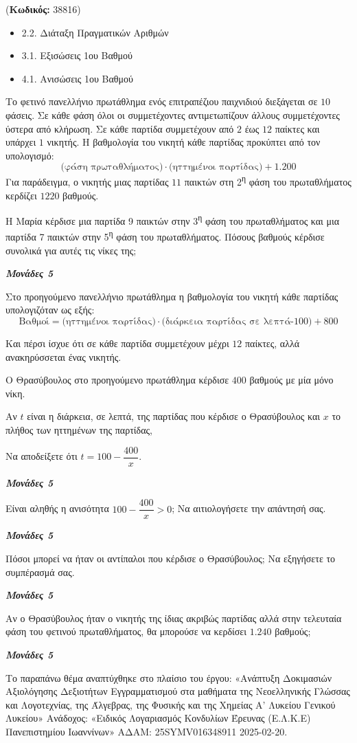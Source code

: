 \documentclass[11pt,a4paper,twoside]{book}
\newcounter{askhsh}[chapter]
\renewcommand{\theaskhsh}{
	\bf{\titlefont{\Large{\thechapter}}.\arabic{askhsh}}
}
\newcommand{\Askhsh}[2]{\refstepcounter{askhsh}{\titlefont{Άσκηση\theaskhsh} - \textcolor{maincolor}{ΘΕΜΑ #2}} ({\small{\textbf{Κωδικός:} #1}})\\}{}
\newenvironment{ylh}{
\begin{tcolorbox}[
breakable,
enhanced standard,
titlerule=0pt,
toprule=0pt, 
rightrule=0pt, 
bottomrule=0pt,
title={\titlefont Ύλη άσκησης},
colback=white,
opacityback=0,
left=2mm,
top=1mm,
bottom=0mm,
boxrule=0pt,
colframe=white,
borderline west={1.5mm}{0pt}{secondarycolor},
leftrule=2mm,
sharp corners,
coltitle=black
]
\begin{itemize}[leftmargin=3mm, itemsep=0mm, label=\textcolor{secondarycolor}{{\small\faBook}}]
}{
\end{itemize}
\end{tcolorbox}
}
\newcommand{\monades}[1]{
\hspace*{\fill}
\textbf{\textit{\textcolor{maincolor}{Μονάδες #1}}}}
\begin{document}
\vspace{4mm}
\Askhsh{38816}{4}
\begin{ylh}
    \item 2.2. Διάταξη Πραγματικών Αριθμών
    \item 3.1. Εξισώσεις 1ου Βαθμού
    \item 4.1. Ανισώσεις 1ου Βαθμού
\end{ylh}

Το φετινό πανελλήνιο πρωτάθλημα ενός επιτραπέζιου παιχνιδιού διεξάγεται σε $10$ φάσεις. Σε κάθε φάση όλοι οι συμμετέχοντες αντιμετωπίζουν άλλους συμμετέχοντες ύστερα από κλήρωση. Σε κάθε παρτίδα συμμετέχουν από $2$ έως $12$ παίκτες και υπάρχει $1$ νικητής. Η βαθμολογία του νικητή κάθε παρτίδας προκύπτει από τον υπολογισμό:
\[\text{(φάση πρωταθλήματος)}\cdot\text{(ηττημένοι παρτίδας)}+1.200\]
Για παράδειγμα, ο νικητής μιας παρτίδας $11$ παικτών στη 2\textsuperscript{η} φάση του πρωταθλήματος κερδίζει $1220$ βαθμούς.
\begin{alist}
\item Η Μαρία κέρδισε μια παρτίδα 9 παικτών στην 3\textsuperscript{η} φάση του πρωταθλήματος και μια παρτίδα 7 παικτών στην 5\textsuperscript{η} φάση του πρωταθλήματος. Πόσους βαθμούς κέρδισε συνολικά για αυτές τις νίκες της;
\monades{5}
\item Στο προηγούμενο πανελλήνιο πρωτάθλημα η βαθμολογία του νικητή κάθε παρτίδας υπολογιζόταν ως εξής:
\[\text{Βαθμοί}=\text{(ηττημένοι παρτίδας)}\cdot\text{(διάρκεια παρτίδας σε λεπτά-100)}+800\]

Και πέρσι ίσχυε ότι σε κάθε παρτίδα συμμετέχουν μέχρι $12$ παίκτες, αλλά ανακηρύσσεται ένας νικητής.

Ο Θρασύβουλος στο προηγούμενο πρωτάθλημα κέρδισε $400$ βαθμούς με μία μόνο νίκη.

Αν $t$ είναι η διάρκεια, σε λεπτά, της παρτίδας που κέρδισε ο Θρασύβουλος και $x$ το πλήθος των ηττημένων της παρτίδας,

\begin{rlist}
\item Να αποδείξετε ότι $t = 100 - \dfrac{400}{x}$.
\monades{5}
\item Είναι αληθής η ανισότητα $100 - \dfrac{400}{x} > 0$; Να αιτιολογήσετε την απάντησή σας.
\monades{5}
\item Πόσοι μπορεί να ήταν οι αντίπαλοι που κέρδισε ο Θρασύβουλος; Να εξηγήσετε το συμπέρασμά σας.
\monades{5}
\item Αν ο Θρασύβουλος ήταν ο νικητής της ίδιας ακριβώς παρτίδας αλλά στην τελευταία φάση του φετινού πρωταθλήματος, θα μπορούσε να κερδίσει $1.240$ βαθμούς;
\monades{5}

{\footnotesize Το παραπάνω θέμα αναπτύχθηκε στο πλαίσιο του έργου: «Ανάπτυξη Δοκιμασιών Αξιολόγησης Δεξιοτήτων Εγγραμματισμού στα μαθήματα της Νεοελληνικής Γλώσσας και Λογοτεχνίας, της Άλγεβρας, της Φυσικής και της Χημείας Α' Λυκείου Γενικού Λυκείου» Ανάδοχος: «Ειδικός Λογαριασμός Κονδυλίων Έρευνας (Ε.Λ.Κ.Ε) Πανεπιστημίου Ιωαννίνων» ΑΔΑΜ: 25SYMV016348911 2025-02-20.}
\end{rlist}
\end{alist}
\end{document}
